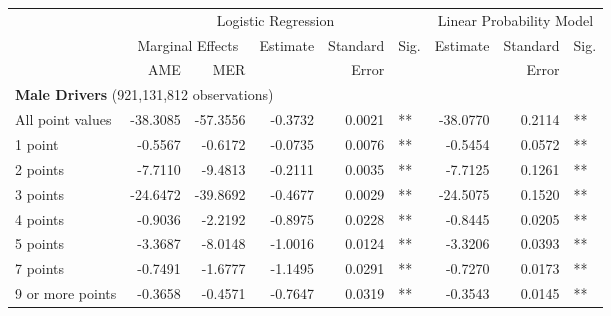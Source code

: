 \documentclass{cje}
\begin{document}
\begin{table}%
\centering 
\begin{tabular}{l r r r r l r r l} 

\hline 
 
 & \multicolumn{5}{c}{Logistic Regression}  & \multicolumn{3}{c}{Linear Probability Model} \\ 

 \cmidrule(lr){2-6}\cmidrule(lr){7-9} 
 & \multicolumn{2}{c}{Marginal Effects} & Estimate & Standard & Sig. & Estimate & Standard & Sig. \\ 

 \cmidrule(lr){2-3} 
 &   AME & MER &          &  Error   &      &          &  Error   &     \\ 

\hline 
 
\multicolumn{8}{l}{\textbf{Male Drivers} (921,131,812 observations)} \\ 

All point values                &  -38.3085        &  -57.3556       &  -0.3732        &  0.0021       &   **       &  -38.0770        &  0.2114       &   **       \\ 
1 point                         &  -0.5567        &  -0.6172       &  -0.0735        &  0.0076       &   **       &  -0.5454        &  0.0572       &   **       \\ 
2 points                        &  -7.7110        &  -9.4813       &  -0.2111        &  0.0035       &   **       &  -7.7125        &  0.1261       &   **       \\ 
3 points                        &  -24.6472        &  -39.8692       &  -0.4677        &  0.0029       &   **       &  -24.5075        &  0.1520       &   **       \\ 
4 points                        &  -0.9036        &  -2.2192       &  -0.8975        &  0.0228       &   **       &  -0.8445        &  0.0205       &   **       \\ 
5 points                        &  -3.3687        &  -8.0148       &  -1.0016        &  0.0124       &   **       &  -3.3206        &  0.0393       &   **       \\ 
7 points                        &  -0.7491        &  -1.6777       &  -1.1495        &  0.0291       &   **       &  -0.7270        &  0.0173       &   **       \\ 
9 or more points                &  -0.3658        &  -0.4571       &  -0.7647        &  0.0319       &   **       &  -0.3543        &  0.0145       &   **       \\ 


\end{tabular}
\end{table}
\end{document}
